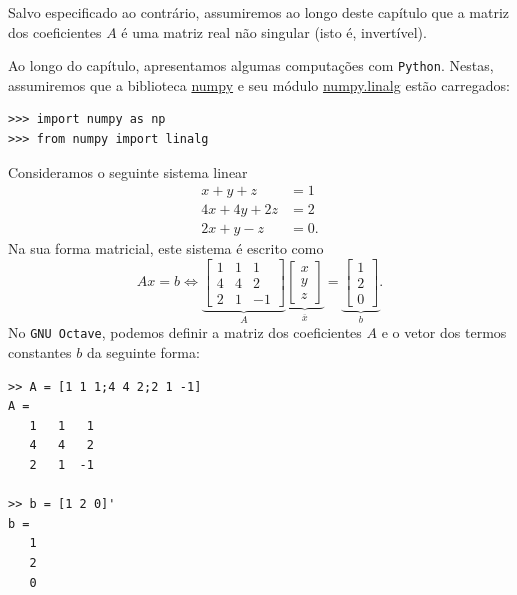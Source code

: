 Salvo especificado ao contrário, assumiremos ao longo deste capítulo que a matriz dos coeficientes $A$ é uma matriz real não singular (isto é, invertível).

\ifispython
Ao longo do capítulo, apresentamos algumas computações com \verb+Python+. Nestas, assumiremos que a biblioteca \href{http://www.numpy.org/}{numpy} e seu módulo \href{https://docs.scipy.org/doc/numpy/reference/routines.linalg.html}{numpy.linalg} estão carregados:
\begin{verbatim}
>>> import numpy as np
>>> from numpy import linalg
\end{verbatim}
\fi

\begin{ex}
  Consideramos o seguinte sistema linear
  \begin{equation}
    \begin{split}
      x+y+z  &= 1\\
      4x+4y+2z&= 2\\
      2x+y-z &= 0.
    \end{split}
  \end{equation}
Na sua forma matricial, este sistema é escrito como
\begin{equation}
  Ax = b \Leftrightarrow
  \underbrace{\begin{bmatrix}
    1 & 1 & 1\\
    4 & 4 & 2\\
    2 & 1 & -1
  \end{bmatrix}}_{A}
\underbrace{
  \begin{bmatrix}
    x\\y\\z
  \end{bmatrix}
}_{\overline{x}} =
\underbrace{
  \begin{bmatrix}
    1\\2\\0
  \end{bmatrix}}_{b}.
\end{equation}
\ifisoctave
No \verb+GNU Octave+, podemos definir a matriz dos coeficientes $A$ e o vetor dos termos constantes $b$ da seguinte forma:
\begin{verbatim}
>> A = [1 1 1;4 4 2;2 1 -1]
A =
   1   1   1
   4   4   2
   2   1  -1

>> b = [1 2 0]'
b =
   1
   2
   0
\end{verbatim}
\fi


\end{ex}

